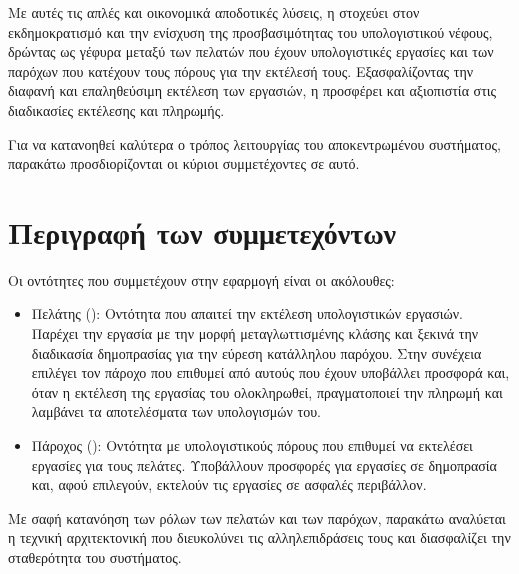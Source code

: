 Με αυτές τις απλές και οικονομικά αποδοτικές λύσεις, η  στοχεύει στον εκδημοκρατισμό και την ενίσχυση της προσβασιμότητας του υπολογιστικού νέφους, δρώντας ως γέφυρα μεταξύ των πελατών που έχουν υπολογιστικές εργασίες και των παρόχων που κατέχουν τους πόρους για την εκτέλεσή τους. Εξασφαλίζοντας την διαφανή και επαληθεύσιμη εκτέλεση των εργασιών, η  προσφέρει και αξιοπιστία στις διαδικασίες εκτέλεσης και πληρωμής.

Για να κατανοηθεί καλύτερα ο τρόπος λειτουργίας του αποκεντρωμένου συστήματος, παρακάτω προσδιορίζονται οι κύριοι συμμετέχοντες σε αυτό.

\section{Περιγραφή των συμμετεχόντων}
Οι οντότητες που συμμετέχουν στην εφαρμογή είναι οι ακόλουθες:
\begin{itemize}
    \item Πελάτης (): Οντότητα που απαιτεί την εκτέλεση υπολογιστικών εργασιών. 
    Παρέχει την εργασία με την μορφή μεταγλωττισμένης κλάσης  και ξεκινά την διαδικασία δημοπρασίας για την εύρεση κατάλληλου παρόχου. Στην συνέχεια επιλέγει τον πάροχο που επιθυμεί από αυτούς που έχουν υποβάλλει προσφορά και, όταν η εκτέλεση της εργασίας του ολοκληρωθεί, πραγματοποιεί την πληρωμή και λαμβάνει τα αποτελέσματα των υπολογισμών του.
    \item Πάροχος (): Οντότητα με υπολογιστικούς πόρους που επιθυμεί να εκτελέσει εργασίες για τους πελάτες. Υποβάλλουν προσφορές για εργασίες σε δημοπρασία και, αφού επιλεγούν, εκτελούν τις εργασίες σε ασφαλές περιβάλλον.
\end{itemize}    

Με σαφή κατανόηση των ρόλων των πελατών και των παρόχων, παρακάτω αναλύεται η τεχνική αρχιτεκτονική που διευκολύνει τις αλληλεπιδράσεις τους και διασφαλίζει την σταθερότητα του συστήματος.

